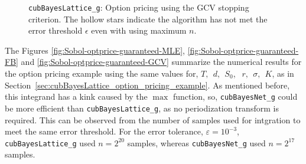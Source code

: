 \documentclass{iitthesis}          %
\newcommand{\code}[1]{\texttt{#1}}
\newcommand\secref{Section~\ref}
\begin{document}
{{{{{{\begin{figure}
	\caption[Lattice: Option pricing guaranteed: GCV]{\code{cubBayesLattice\_g}: Option pricing using the GCV stopping criterion. The hollow stars indicate the algorithm has not met the error threshold $\epsilon$ even with using maximum $n$.} 
	\label{fig:optprice-guaranteed-GCV}
\end{figure}


\Subsection{Using \code{cubBayesNet\_g}}
The Figures \ref{fig:Sobol-optprice-guaranteed-MLE}, \ref{fig:Sobol-optprice-guaranteed-FB} and 
\ref{fig:Sobol-optprice-guaranteed-GCV} summarize the numerical results for the option pricing example using the same values for,
$
T, \ \ d, \ \ S_0$, $\ \ r, \ \ \sigma, \ \ K
$, as in \secref{sec:cubBayesLattice_option_pricing_example}.
As mentioned before, this integrand has a kink caused by the $\max$ function, so, \code{cubBayesNet\_g} could be more efficient than \code{cubBayesLattice\_g}, as no periodization transform is required. This can be observed from the number of samples used for intgration to meet the same error threshold. For the error tolerance, $\varepsilon=10^{-3}$,  \code{cubBayesLattice\_g} used $n=2^{20}$ samples, whereas \code{cubBayesNet\_g} used $n=2^{17}$ samples.


}}}}}}
\end{document}
